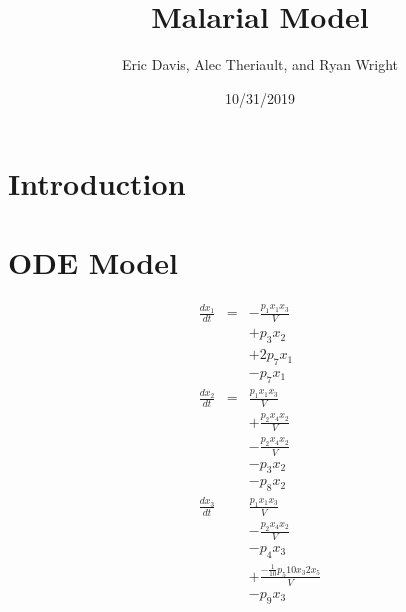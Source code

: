 \documentclass[12pt]{galois-whitepaper}
\author{Eric Davis, Alec Theriault, and Ryan Wright}
\title{Malarial Model}
\date{10/31/2019}
\begin{document}
\maketitle

\vspace*{2cm}
\tableofcontents

\section{Introduction}

\section{ODE Model}

\begin{eqnarray}
  \frac{d x_1}{dt} &=& -\frac{p_1  x_1  x_3}{V} \\
                   && + p_3 x_2\\
                   && + 2 p_7 x_1\\
                   && - p_7 x_1\\
  \frac{d x_2}{dt} &=& \frac{p_1  x_1  x_3}{V} \\
                   && + \frac{p_2 x_4 x_2}{V}\\
                   && - \frac{p_2 x_4 x_2}{V}\\
                   && - p_3 x_2\\
                   && - p_8 x_2\\
  \frac{d x_3}{dt} && \frac{p_1 x_1 x_3}{V}\\
                   && - \frac{p_2 x_4 x_2}{V}\\
                   && - p_4 x_3\\
                   && + \frac{ -\frac{1}{10} p_5 10 x_3 2 x_5}{V}\\
                   && - p_9 x_3\\
\end{eqnarray}
\end{document}
